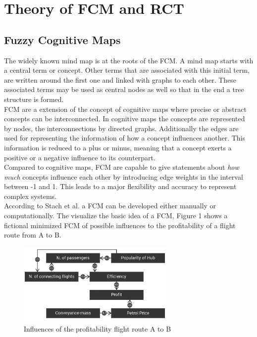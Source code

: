 \documentclass[conference]{IEEEtran}
\begin{document}
\section{Theory of FCM and RCT}
\subsection{Fuzzy Cognitive Maps}
The widely known mind map is at the roots of the FCM. A mind map starts with a central term or concept. Other terms that are associated with this initial term, are written around the first one and linked with graphs to each other. These associated terms may be used as central nodes as well so that in the end a tree structure is formed.\\
FCM are a extension of the concept of cognitive maps where precise or abstract concepts can be interconnected\cite{kosko1986}. In cognitive maps the concepts are represented by nodes, the interconnections by directed graphs. Additionally the edges are used for representing the information of how a concept influences another. This information is reduced to a plus or minus, meaning that a concept exerts a positive or a negative influence to its counterpart.\\
Compared to cognitive maps, FCM are capable to give statements about \emph{how much} concepts influence each other by introducing edge weights in the interval between -1 and 1. This leads to a major flexibility and accuracy to represent complex systems.\\
According to Stach et al. \cite{stach2005} a FCM can be developed either manually or computationally. The visualize the basic idea of a FCM, Figure 1 shows a fictional minimized FCM of possible influences to the profitability of a flight route from A to B.

\begin{figure}[ht]
\includegraphics[width=3in]{img/ficFCM.png}
\caption{Influences of the profitability flight route A to B}
\label{fig:cm}
\end{figure}
\end{document}
